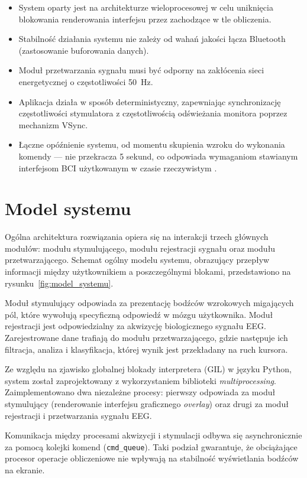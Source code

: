 \begin{itemize}
    \item System oparty jest na architekturze wieloprocesowej w celu uniknięcia blokowania renderowania interfejsu przez zachodzące w tle obliczenia.
    \item Stabilność działania systemu nie zależy od wahań jakości łącza Bluetooth (zastosowanie buforowania danych).
    \item Moduł przetwarzania sygnału musi być odporny na zakłócenia sieci energetycznej o częstotliwości 50~Hz.
    \item Aplikacja działa w sposób deterministyczny, zapewniając synchronizację częstotliwości stymulatora z częstotliwością odświeżania monitora poprzez mechanizm VSync.
    \item Łączne opóźnienie systemu, od momentu skupienia wzroku do wykonania komendy --- nie przekracza 5 sekund, co odpowiada wymaganiom stawianym interfejsom BCI użytkowanym w czasie rzeczywistym \cite{wolpaw2002}.
\end{itemize}

\section{Model systemu}

Ogólna architektura rozwiązania opiera się na interakcji trzech głównych modułów: modułu stymulującego, modułu rejestracji sygnału oraz modułu przetwarzającego.
Schemat ogólny modelu systemu, obrazujący przepływ informacji między użytkownikiem a poszczególnymi blokami, przedstawiono na rysunku~\ref{fig:model_systemu}.

Moduł stymulujący odpowiada za prezentację bodźców wzrokowych migających pól, które wywołują specyficzną odpowiedź w mózgu użytkownika.
Moduł rejestracji jest odpowiedzialny za akwizycję biologicznego sygnału EEG.
Zarejestrowane dane trafiają do modułu przetwarzającego, gdzie następuje ich filtracja, analiza i klasyfikacja, której wynik jest przekładany na ruch kursora.

Ze względu na zjawisko globalnej blokady interpretera (GIL) w języku Python, system został zaprojektowany z wykorzystaniem biblioteki \textit{multiprocessing}.
Zaimplementowano dwa niezależne procesy: pierwszy odpowiada za moduł stymulujący (renderowanie interfejsu graficznego \textit{overlay}) oraz drugi za moduł rejestracji i przetwarzania sygnału EEG.

Komunikacja między procesami akwizycji i stymulacji odbywa się asynchronicznie za pomocą kolejki komend (\texttt{cmd\_queue}). Taki podział gwarantuje, że obciążające procesor operacje obliczeniowe nie wpływają na stabilność wyświetlania bodźców na ekranie.

